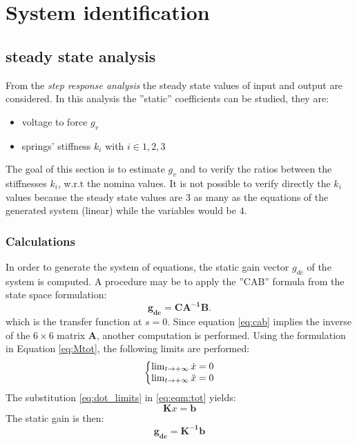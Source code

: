 \documentclass[twosided,a4paper]{article}           %
\makeatletter
\newenvironment{sistema}%
{\left\lbrace\begin{array}{@{}l@{}}}%
	{\end{array}\right.}
\makeatother
\begin{document}
\section{System identification}
	
\subsection{steady state analysis}
\label{sec:step}
From the \textit{step response analysis} the steady state values of input and output are considered. In this analysis the ''static'' coefficients can be studied, they are:
\begin{itemize}
	\item voltage to force $g_v$
	\item springs' stiffness $k_i$ with $i \in 1,2,3$
\end{itemize} 
The goal of this section is to estimate $g_v$ and to verify the ratios between the stiffnesses $k_i$, w.r.t the nomina values. It is not possible to verify directly the $k_i$ values because the steady state values are $3$ as many as the equations of the generated system (linear) while the variables would be $4$.
\subsubsection{Calculations}
In order to generate the system of equations, the static gain vector $g_{dc}$ of the system is computed. A procedure may be to apply the ''CAB'' formula from the state space formulation:
\begin{equation}
\label{eq:cab}
	\bm{g_{dc}} =	\bm{CA^{-1}B}.
\end{equation}
which is the transfer function at $s = 0$. Since equation \eqref{eq:cab} implies the inverse of the $6 \times 6$ matrix $\bm A$, another computation is performed. Using the formulation in Equation \eqref{eq:Mtot}, the following limits are performed:
\begin{equation}
	\begin{sistema}
	\lim_{t \to + \infty}{\dot{x}}  = 0  \\
	\lim_{t \to + \infty}{\ddot{x}} = 0
	\end{sistema}
	\label{eq:dot_limits}
\end{equation}
The substitution \eqref{eq:dot_limits} in \eqref{eq:eqm:tot} yields:
\begin{equation}
\bm K x = \bm b
\label{eq:dot0}
\end{equation} The static gain is then:
\begin{equation}
	\bm{g_{dc}} = \bm{K^{-1}}\bm{b}
\end{equation}
\end{document}
